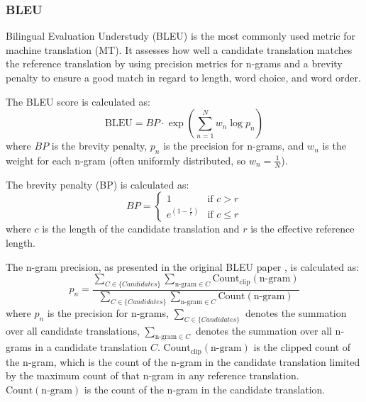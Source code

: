 \documentclass[a4paper, 11pt]{article}
\begin{document}
\subsubsection{BLEU}

Bilingual Evaluation Understudy (BLEU) \cite{papieni-2002-bleu} is the most commonly used metric for machine translation (MT). It assesses how well a candidate translation matches the reference translation by using precision metrics for n-grams and a brevity penalty to ensure a good match in regard to length, word choice, and word order.

The BLEU score is calculated as:
\begin{equation}
    \text{BLEU} = BP \cdot \exp \left( \sum_{n=1}^{N} w_n \log p_n \right)
\end{equation}
where \( BP \) is the brevity penalty, \( p_n \) is the precision for n-grams, and \( w_n \) is the weight for each n-gram (often uniformly distributed, so \( w_n = \frac{1}{N} \)).

The brevity penalty (BP) is calculated as:
\begin{equation}
    BP = \begin{cases}
        1                     & \text{if } c > r    \\
        e^{(1 - \frac{r}{c})} & \text{if } c \leq r
    \end{cases}
\end{equation}
where \( c \) is the length of the candidate translation and \( r \) is the effective reference length.

The n-gram precision, as presented in the original BLEU paper \cite{papieni-2002-bleu}, is calculated as:
\begin{equation}
    p_n = \frac{\sum_{C \in \{Candidates\}} \sum_{\text{n-gram} \in C} \text{Count}_{\text{clip}}(\text{n-gram})}{\sum_{C \in \{Candidates\}} \sum_{\text{n-gram} \in C} \text{Count}(\text{n-gram})}
\end{equation}
where \( p_n \) is the precision for n-grams, \( \sum_{C \in \{Candidates\}} \) denotes the summation over all candidate translations, \( \sum_{\text{n-gram} \in C} \) denotes the summation over all n-grams in a candidate translation \( C \). \( \text{Count}_{\text{clip}}(\text{n-gram}) \) is the clipped count of the n-gram, which is the count of the n-gram in the candidate translation limited by the maximum count of that n-gram in any reference translation. \( \text{Count}(\text{n-gram}) \) is the count of the n-gram in the candidate translation.
\end{document}
